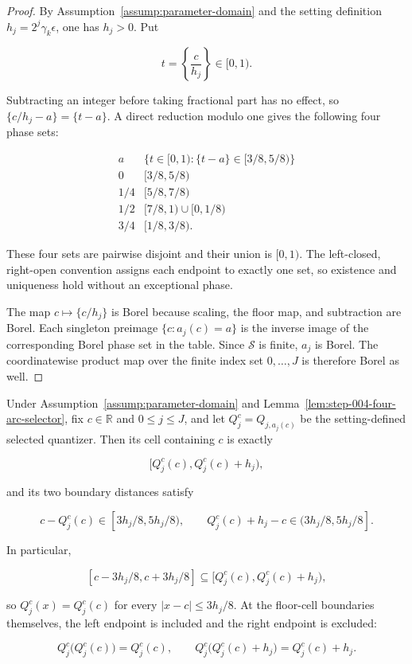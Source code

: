 \begin{proof}
By Assumption~\ref{assump:parameter-domain} and the setting definition \(h_j=2^j\gamma_k\epsilon\), one has \(h_j>0\). Put

\[
t=\left\{\frac{c}{h_j}\right\}\in[0,1).
\]

Subtracting an integer before taking fractional part has no effect, so
\(\{c/h_j-a\}=\{t-a\}\). A direct reduction modulo one gives the following four phase sets:

\[
\begin{array}{c|c}
a & \{t\in[0,1):\{t-a\}\in[3/8,5/8)\}\\ \hline
0 & [3/8,5/8)\\
1/4 & [5/8,7/8)\\
1/2 & [7/8,1)\cup[0,1/8)\\
3/4 & [1/8,3/8).
\end{array}
\]

These four sets are pairwise disjoint and their union is \([0,1)\). The left-closed, right-open convention assigns each endpoint to exactly one set, so existence and uniqueness hold without an exceptional phase.

The map \(c\mapsto\{c/h_j\}\) is Borel because scaling, the floor map, and subtraction are Borel. Each singleton preimage \(\{c:a_j(c)=a\}\) is the inverse image of the corresponding Borel phase set in the table. Since \(\mathcal S\) is finite, \(a_j\) is Borel. The coordinatewise product map over the finite index set \(0,\ldots,J\) is therefore Borel as well.
\end{proof}

\begin{proposition}\label{prop:step-004-cell-margin}
Under Assumption~\ref{assump:parameter-domain} and Lemma~\ref{lem:step-004-four-arc-selector}, fix \(c\in\mathbb R\) and \(0\le j\le J\), and let \(Q_j^c=Q_{j,a_j(c)}\) be the setting-defined selected quantizer. Then its cell containing \(c\) is exactly

\[
[Q_j^c(c),Q_j^c(c)+h_j),
\]

and its two boundary distances satisfy

\[
c-Q_j^c(c)\in[3h_j/8,5h_j/8),
\qquad
Q_j^c(c)+h_j-c\in(3h_j/8,5h_j/8].
\]

In particular,

\[
[c-3h_j/8,c+3h_j/8]
\subseteq[Q_j^c(c),Q_j^c(c)+h_j),
\]

so \(Q_j^c(x)=Q_j^c(c)\) for every \(|x-c|\le3h_j/8\). At the floor-cell boundaries themselves, the left endpoint is included and the right endpoint is excluded:

\[
Q_j^c\bigl(Q_j^c(c)\bigr)=Q_j^c(c),
\qquad
Q_j^c\bigl(Q_j^c(c)+h_j\bigr)=Q_j^c(c)+h_j.
\]
\end{proposition}

